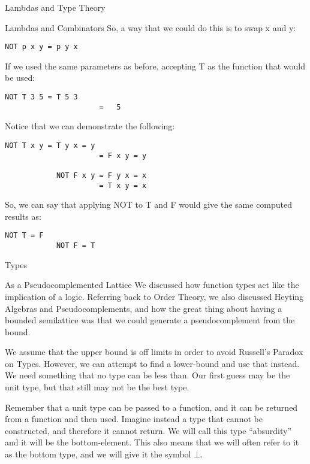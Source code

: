\begin{part}{Lambdas and Type Theory}
\begin{chapter}{Lambdas and Combinators}
        So, a way that we could do this is to swap x and y:
        
        \begin{lstlisting}[language=Lambda]
            NOT p x y = p y x
        \end{lstlisting}
        
        If we used the same parameters as before, accepting T as the function that would be used:
        
        \begin{lstlisting}[language=Lambda]
            NOT T 3 5 = T 5 3
                      =   5
        \end{lstlisting}
        
        Notice that we can demonstrate the following:
        
        \begin{lstlisting}[language=Lambda]
            NOT T x y = T y x = y
                      = F x y = y
                
            NOT F x y = F y x = x
                      = T x y = x
        \end{lstlisting}
        
        So, we can say that applying NOT to T and F would give the same computed results as:
        \begin{lstlisting}[language=Lambda]
            NOT T = F
            NOT F = T
        \end{lstlisting}
        
        
    \end{chapter}
    
    \begin{chapter}{Types}
        \begin{section}{As a Pseudocomplemented Lattice}
            We discussed how function types act like the implication of a logic. Referring back to Order Theory, we also discussed Heyting Algebras and Pseudocomplements, and how the great thing about having a bounded semilattice was that we could generate a pseudocomplement from the bound.
        
            We assume that the upper bound is off limits in order to avoid Russell's Paradox on Types. However, we can attempt to find a lower-bound and use that instead. We need something that no type can be less than. Our first guess may be the unit type, but that still may not be the best type.
        
            Remember that a unit type can be passed to a function, and it can be returned from a function and then used. Imagine instead a type that cannot be constructed, and therefore it cannot return. We will call this type ``absurdity'' and it will be the bottom-element. This also means that we will often refer to it as the bottom type, and we will give it the symbol $\bot$.
        

\end{section}
\end{chapter}
\end{part}
